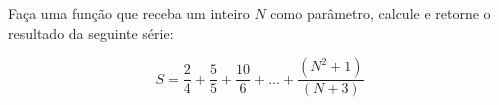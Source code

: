 
\question[10]

Faça uma função que receba um inteiro $N$ como parâmetro, calcule e retorne o resultado da seguinte série:

\begin{equation*}
	S = \frac{2}{4} + \frac{5}{5} + \frac{10}{6} + \ldots + \frac{(N^2 + 1)}{(N + 3)}
\end{equation*}
